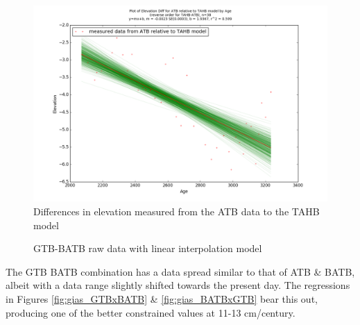 \begin{figure}[h]
	\includegraphics[width=0.9\linewidth]{data/bothNonZero/withinSeventyFivePercent/gias/theGIA_ATB_relative_to_TAHB.png}
	\caption{Differences in elevation measured from the ATB data to the TAHB model}
	\label{fig:gias_ATBxTAHB}
\end{figure}
\newpage






\begin{figure}[h]
	\caption{GTB-BATB raw data with linear interpolation model}
	\label{fig:data_GTBxBATB}
\end{figure}
The GTB BATB combination has a data spread similar to that of ATB \& BATB, albeit
with a data range slightly shifted towards the present day. The regressions in
Figures \ref{fig:gias_GTBxBATB} \& \ref{fig:gias_BATBxGTB} bear this out,
producing one of the better constrained values at 11-13 cm/century.
\newpage

